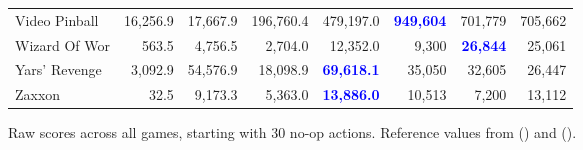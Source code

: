 \documentclass[letterpaper]{article}
\newcommand{\citet}[1]{\citeauthor{#1} (\citeyear{#1})}
\begin{document}
\begin{figure*}
\begin{tabular}{ l | r|r|r|r|r|r| r }
Video Pinball & 16,256.9 & 17,667.9 & 196,760.4 & 479,197.0 & \textbf{\textcolor{blue}{949,604}} & 701,779 & 705,662 \\
Wizard Of Wor & 563.5 & 4,756.5 & 2,704.0 & 12,352.0 & 9,300 & \textbf{\textcolor{blue}{26,844}} & 25,061 \\
Yars' Revenge & 3,092.9 & 54,576.9 & 18,098.9 & \textbf{\textcolor{blue}{69,618.1}} & 35,050 & 32,605 & 26,447 \\
Zaxxon & 32.5 & 9,173.3 & 5,363.0 & \textbf{\textcolor{blue}{13,886.0}} & 10,513 & 7,200 & 13,112
\end{tabular}
\caption{Raw scores across all games, starting with 30 no-op actions. Reference values from \citet{wang2016dueling} and \citet{c51}.\label{fig:atari_sota}}
\end{figure*}
\end{document}
